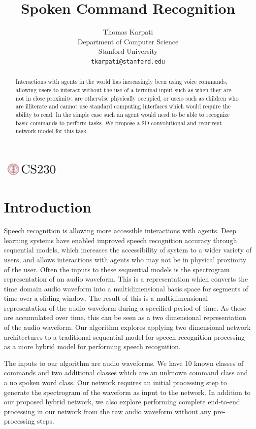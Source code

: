 \documentclass{article}
\title{Spoken Command Recognition}
\author{
  Thomas Karpati \\
  Department of Computer Science\\
  Stanford University\\
  \texttt{tkarpati@stanford.edu} \\
}
\begin{document}

\begin{center}
\includegraphics[width=3cm, height=0.7cm]{CS230}
\end{center}

\maketitle

\begin{abstract}
  Interactions with agents in the world has increasingly been using
  voice commands, allowing users to interact without the use of a
  terminal input such as when they are not in close proximity, are
  otherwise physically occupied, or users such as children who
  are illiterate and cannot use standard computing interfaces which
  would require the ability to read. In the simple case such an agent
  would need to be able to recognize basic commands to perform
  tasks. We propose a 2D convolutional and recurrent network model for
  this task.
\end{abstract}

\section{Introduction}
Speech recognition is allowing more accessible interactions with
agents. Deep learning systems have enabled improved speech
recognition accuracy through sequential models, which increases the
accessibility of system to a wider variety of users, and allows
interactions with agents who may not be in physical proximity of the
user. Often the inputs to these sequential models is the spectrogram
representation of an audio waveform. This is a representation which
converts the time domain audio waveform into a multidimensional basis
space for segments of time over a sliding window. The result of this
is a multidimensional representation of the audio waveform during a
specified period of time. As these are accumulated over time, this can
be seen as a two dimensional representation of the audio waveform. Our
algorithm explores applying two dimensional network architectures to
a traditional sequential model for speech recognition processing as a
more hybrid model for performing speech recognition.

The inputs to our algorithm are audio waveforms. We have 10 known classes of
commands and two additional classes which are an unknown command class
and a no spoken word class. Our network requires an initial processing
step to generate the spectrogram of the waveform as input to the
network. In addition to our proposed hybrid network, we also explore
performing complete end-to-end processing in our network from the raw
audio waveform without any pre-processing steps. 
\end{document}

